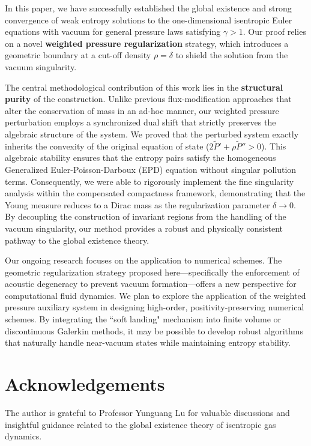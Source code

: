 \documentclass[12pt, reqno]{article}
\theoremstyle{definition}
\numberwithin{equation}{section}
\begin{document}
In this paper, we have successfully established the global existence and strong convergence of weak entropy solutions to the one-dimensional isentropic Euler equations with vacuum for general pressure laws satisfying $\gamma > 1$. Our proof relies on a novel \textbf{weighted pressure regularization} strategy, which introduces a geometric boundary at a cut-off density $\rho=\delta$ to shield the solution from the vacuum singularity.

The central methodological contribution of this work lies in the \textbf{structural purity} of the construction. Unlike previous flux-modification approaches that alter the conservation of mass in an ad-hoc manner, our weighted pressure perturbation employs a synchronized dual shift that strictly preserves the algebraic structure of the system. We proved that the perturbed system exactly inherits the convexity of the original equation of state ($2\tilde{P}'+\rho\tilde{P}'' > 0$). This algebraic stability ensures that the entropy pairs satisfy the homogeneous Generalized Euler-Poisson-Darboux (EPD) equation without singular pollution terms. Consequently, we were able to rigorously implement the fine singularity analysis within the compensated compactness framework, demonstrating that the Young measure reduces to a Dirac mass as the regularization parameter $\delta \to 0$. By decoupling the construction of invariant regions from the handling of the vacuum singularity, our method provides a robust and physically consistent pathway to the global existence theory.

Our ongoing research focuses on the application to numerical schemes. The geometric regularization strategy proposed here—specifically the enforcement of acoustic degeneracy to prevent vacuum formation—offers a new perspective for computational fluid dynamics. We plan to explore the application of the weighted pressure auxiliary system in designing high-order, positivity-preserving numerical schemes. By integrating the ``soft landing" mechanism into finite volume or discontinuous Galerkin methods, it may be possible to develop robust algorithms that naturally handle near-vacuum states while maintaining entropy stability.


\section*{Acknowledgements}
The author is grateful to Professor Yunguang Lu for valuable discussions and insightful guidance related to the global existence theory of isentropic gas dynamics.
\end{document}
